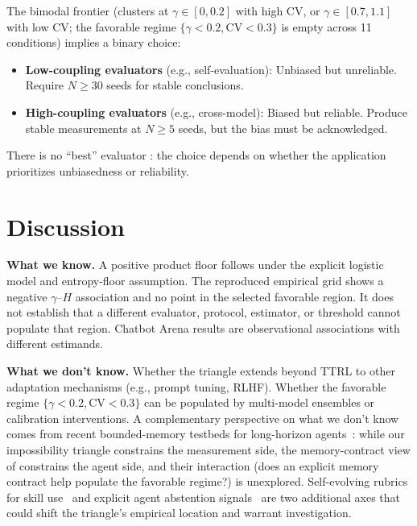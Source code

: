 \documentclass[11pt]{article}
\begin{document}
The bimodal frontier (clusters at $\gamma \in [0, 0.2]$ with high $\mathrm{CV}$, or $\gamma \in [0.7, 1.1]$ with low $\mathrm{CV}$; the favorable regime $\{\gamma < 0.2, \mathrm{CV} < 0.3\}$ is empty across 11 conditions) implies a binary choice:

\begin{itemize}[leftmargin=*,nosep]
 \item \textbf{Low-coupling evaluators} (e.g., self-evaluation): Unbiased but unreliable. Require $N \geq 30$ seeds for stable conclusions.
 \item \textbf{High-coupling evaluators} (e.g., cross-model): Biased but reliable. Produce stable measurements at $N \geq 5$ seeds, but the bias must be acknowledged.
\end{itemize}

There is no ``best'' evaluator : the choice depends on whether the application prioritizes unbiasedness or reliability.

\section{Discussion}

\textbf{What we know.} A positive product floor follows under the explicit logistic model and entropy-floor assumption. The reproduced empirical grid shows a negative $\gamma$--$H$ association and no point in the selected favorable region. It does not establish that a different evaluator, protocol, estimator, or threshold cannot populate that region. Chatbot Arena results are observational associations with different estimands.

\textbf{What we don't know.} Whether the triangle extends beyond TTRL to other adaptation mechanisms (e.g., prompt tuning, RLHF). Whether the favorable regime $\{\gamma < 0.2, \mathrm{CV} < 0.3\}$ can be populated by multi-model ensembles or calibration interventions. A complementary perspective on what we don't know comes from recent bounded-memory testbeds for long-horizon agents~\cite{cheng2026agenticsts}: while our impossibility triangle constrains the measurement side, the memory-contract view of \citet{cheng2026agenticsts} constrains the agent side, and their interaction (does an explicit memory contract help populate the favorable regime?) is unexplored. Self-evolving rubrics for skill use~\cite{zhu2026skillcoach} and explicit agent abstention signals~\cite{luo2026abstention} are two additional axes that could shift the triangle's empirical location and warrant investigation.
\end{document}

